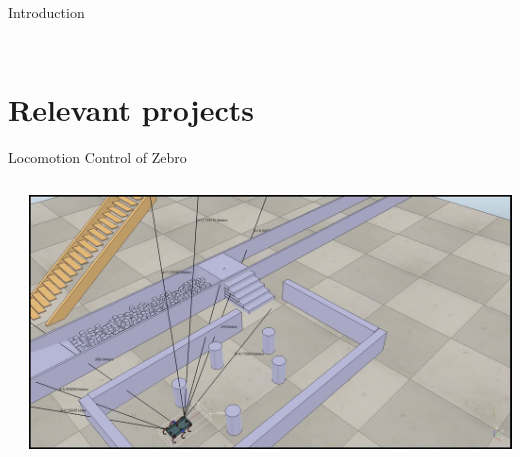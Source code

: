 \documentclass{beamer}
\renewcommand{\cite}[1]{\footnote<.->[frame]{\fullcite{#1}}}
\begin{document}
\begin{frame}{Introduction}
\begin{columns}
\begin{column}{0.4\textwidth}
\begin{figure}[ht]
			\end{figure}			
		\end{column}
	\end{columns}
\end{frame}

\section{Relevant projects}


\begin{frame}{Locomotion Control of Zebro}
		\begin{columns}
			\begin{column}{0.5\textwidth}
			\end{column}
			\begin{column}{0.5\textwidth}
				\includegraphics[height=0.55\textwidth]{recording.png}
			\end{column}
		\end{columns}
\end{frame}
\end{document}
